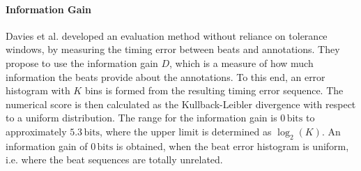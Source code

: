 \documentclass{scrartcl}
\begin{document}
\paragraph{Information Gain}
Davies et al. \cite{Davies2009b} developed an evaluation method without reliance on tolerance windows, by measuring the timing error between beats and annotations. They propose to use the information gain $D$, which is a measure of how much information the beats provide about the annotations. To this end, an error histogram with $K$ bins is formed from the resulting timing error sequence. The numerical score is then calculated as the Kullback-Leibler divergence with respect to a uniform distribution. The range for the information gain is $0\,\text{bits}$ to approximately $5.3\,\text{bits}$, where the upper limit is determined as $\log_2(K)$. An information gain of $0\,\text{bits}$ is obtained, when the beat error histogram is uniform, i.e. where the beat sequences are totally unrelated.
\end{document}
